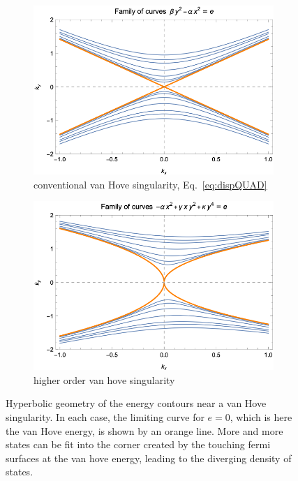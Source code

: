 \begin{figure}[h]
    \centering
    \begin{subfigure}[t]{0.45\linewidth}
        \centering
        \includegraphics[width=\textwidth]{figures/introduction/logcontours.png}
        \caption{\centering conventional van Hove singularity, Eq.~\eqref{eq:dispQUAD}}
        \label{fig:logcontours}
    \end{subfigure}
    \hfill
    \begin{subfigure}[t]{0.45\linewidth}
        \centering
        \includegraphics[width=\textwidth]{figures/introduction/paracontours.png}
        \caption{\centering higher order van hove singularity}
        \label{fig:paracontours}
    \end{subfigure}
    \hfill
    \caption{Hyperbolic geometry of the energy contours near a van Hove singularity. In each case, the limiting curve for $e=0$, which is here the van Hove energy, is shown by an orange line. More and more states can be fit into the corner created by the touching fermi surfaces at the van hove energy, leading to the diverging density of states.}
    \label{fig:vanHoveillustration}
\end{figure}

